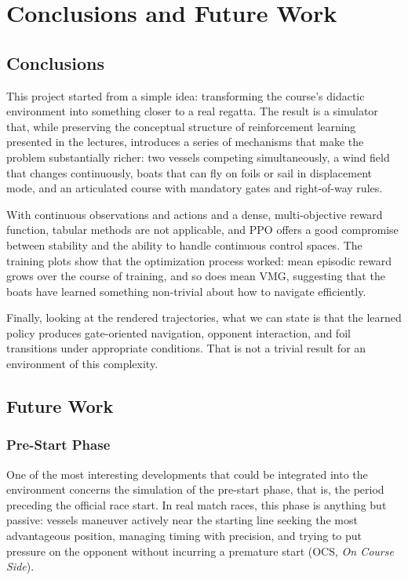\documentclass{article}
\begin{document}
\section{Conclusions and Future Work}
\subsection{Conclusions}
This project started from a simple idea: transforming the course's didactic environment into something closer to a real regatta. The result is a simulator that, while preserving the conceptual structure of reinforcement learning presented in the lectures, introduces a series of mechanisms that make the problem substantially richer: two vessels competing simultaneously, a wind field that changes continuously, boats that can fly on foils or sail in displacement mode, and an articulated course with mandatory gates and right-of-way rules.

With continuous observations and actions and a dense, multi-objective reward function, tabular methods are not applicable, and PPO offers a good compromise between stability and the ability to handle continuous control spaces. The training plots show that the optimization process worked: mean episodic reward grows over the course of training, and so does mean VMG, suggesting that the boats have learned something non-trivial about how to navigate efficiently.

Finally, looking at the rendered trajectories, what we can state is that the learned policy produces gate-oriented navigation, opponent interaction, and foil transitions under appropriate conditions. That is not a trivial result for an environment of this complexity.

\subsection{Future Work}

\subsubsection{Pre-Start Phase}
One of the most interesting developments that could be integrated into the environment concerns the simulation of the pre-start phase, that is, the period preceding the official race start. In real match races, this phase is anything but passive: vessels maneuver actively near the starting line seeking the most advantageous position, managing timing with precision, and trying to put pressure on the opponent without incurring a premature start (OCS, \textit{On Course Side}).
\end{document}
